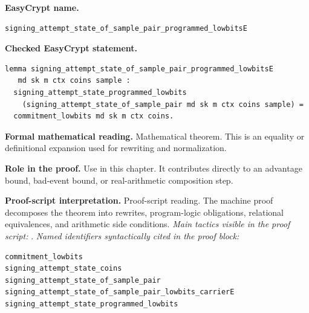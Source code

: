 \begin{formaltheorem}
\noindent\textbf{EasyCrypt name.}
\begin{lstlisting}[language=EasyCrypt,basicstyle=\ttfamily\scriptsize]
signing_attempt_state_of_sample_pair_programmed_lowbitsE
\end{lstlisting}
\noindent\textbf{Checked EasyCrypt statement.}
\begin{lstlisting}[language=EasyCrypt,basicstyle=\ttfamily\scriptsize]
lemma signing_attempt_state_of_sample_pair_programmed_lowbitsE
   md sk m ctx coins sample :
  signing_attempt_state_programmed_lowbits
    (signing_attempt_state_of_sample_pair md sk m ctx coins sample) =
  commitment_lowbits md sk m ctx coins.
\end{lstlisting}
\noindent\textbf{Formal mathematical reading.}
Mathematical theorem. This is an equality or definitional expansion used for rewriting and normalization.

\noindent\textbf{Role in the proof.}
Use in this chapter. It contributes directly to an advantage bound, bad-event bound, or real-arithmetic composition step.

\noindent\textbf{Proof-script interpretation.}
Proof-script reading. The machine proof decomposes the theorem into rewrites, program-logic obligations, relational equivalences, and arithmetic side conditions.
\emph{Main tactics visible in the proof script:} .
\emph{Named identifiers syntactically cited in the proof block:}
\begin{lstlisting}[language=EasyCrypt,basicstyle=\ttfamily\scriptsize]
commitment_lowbits
signing_attempt_state_coins
signing_attempt_state_of_sample_pair
signing_attempt_state_of_sample_pair_lowbits_carrierE
signing_attempt_state_programmed_lowbits
\end{lstlisting}

\end{formaltheorem}

